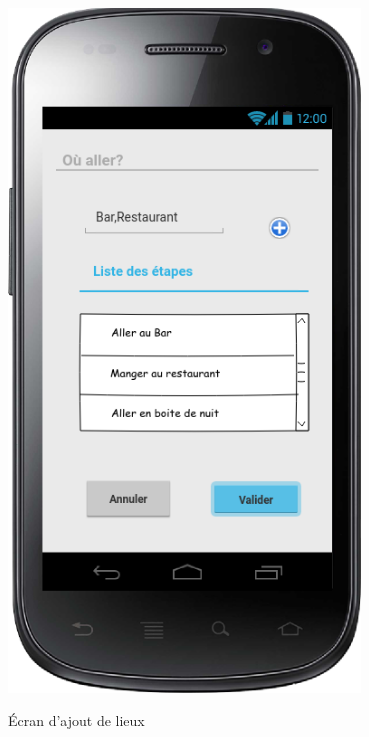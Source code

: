 \documentclass[a4paper, 12pt, notitlepage]{article} %
\begin{document}
\begin{maquetteFig}[!htb]
  \centering
     \includegraphics[width=0.7\textwidth]{ajout_lieux.png}
     \caption{Écran d'ajout de lieux}
     \label{Maquette:AjoutLieux}
\end{maquetteFig}
\end{document}
